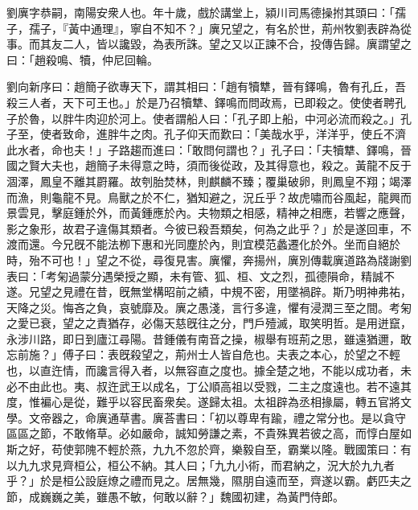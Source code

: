 
\begin{pinyinscope}
劉廙字恭嗣，南陽安衆人也。年十歲，戲於講堂上，潁川司馬德操拊其頭曰：「孺子，孺子，『黃中通理』，寧自不知不？」廙兄望之，有名於世，荊州牧劉表辟為從事。而其友二人，皆以讒毀，為表所誅。望之又以正諫不合，投傳告歸。廙謂望之曰：「趙殺鳴、犢，仲尼回輪。

劉向新序曰：趙簡子欲專天下，謂其相曰：「趙有犢犨，晉有鐸鳴，魯有孔丘，吾殺三人者，天下可王也。」於是乃召犢犨、鐸鳴而問政焉，已即殺之。使使者聘孔子於魯，以胖牛肉迎於河上。使者謂船人曰：「孔子即上船，中河必流而殺之。」孔子至，使者致命，進胖牛之肉。孔子仰天而歎曰：「美哉水乎，洋洋乎，使丘不濟此水者，命也夫！」子路趨而進曰：「敢問何謂也？」孔子曰：「夫犢犨、鐸鳴，晉國之賢大夫也，趙簡子未得意之時，須而後從政，及其得意也，殺之。黃龍不反于涸澤，鳳皇不離其罻羅。故刳胎焚林，則麒麟不臻；覆巢破卵，則鳳皇不翔；竭澤而漁，則龜龍不見。鳥獸之於不仁，猶知避之，況丘乎？故虎嘯而谷風起，龍興而景雲見，擊庭鍾於外，而黃鍾應於內。夫物類之相感，精神之相應，若響之應聲，影之象形，故君子違傷其類者。今彼已殺吾類矣，何為之此乎？」於是遂回車，不渡而還。今兄旣不能法栁下惠和光同塵於內，則宜模范蠡遷化於外。坐而自絕於時，殆不可也！」望之不從，尋復見害。廙懼，奔揚州，廙別傳載廙道路為牋謝劉表曰：「考匊過蒙分遇榮授之顯，未有管、狐、桓、文之烈，孤德隕命，精誠不遂。兄望之見禮在昔，旣無堂構昭前之績，中規不密，用墜禍辟。斯乃明神弗祐，天降之災。悔吝之負，哀號靡及。廙之愚淺，言行多違，懼有浸潤三至之間。考匊之愛已衰，望之之責猶存，必傷天慈旣往之分，門戶殪滅，取笑明哲。是用迸竄，永涉川路，即日到廬江尋陽。昔鍾儀有南音之操，椒舉有班荊之思，雖遠猶邇，敢忘前施？」傅子曰：表旣殺望之，荊州士人皆自危也。夫表之本心，於望之不輕也，以直迕情，而讒言得入者，以無容直之度也。據全楚之地，不能以成功者，未必不由此也。夷、叔迕武王以成名，丁公順高祖以受戮，二主之度遠也。若不遠其度，惟褊心是從，難乎以容民畜衆矣。遂歸太祖。太祖辟為丞相掾屬，轉五官將文學。文帝器之，命廙通草書。廙荅書曰：「初以尊卑有踰，禮之常分也。是以貪守區區之節，不敢脩草。必如嚴命，誠知勞謙之素，不貴殊異若彼之高，而惇白屋如斯之好，苟使郭隗不輕於燕，九九不忽於齊，樂毅自至，霸業以隆。戰國策曰：有以九九求見齊桓公，桓公不納。其人曰；「九九小術，而君納之，況大於九九者乎？」於是桓公設庭燎之禮而見之。居無幾，隰朋自遠而至，齊遂以霸。虧匹夫之節，成巍巍之美，雖愚不敏，何敢以辭？」魏國初建，為黃門侍郎。


\end{pinyinscope}
